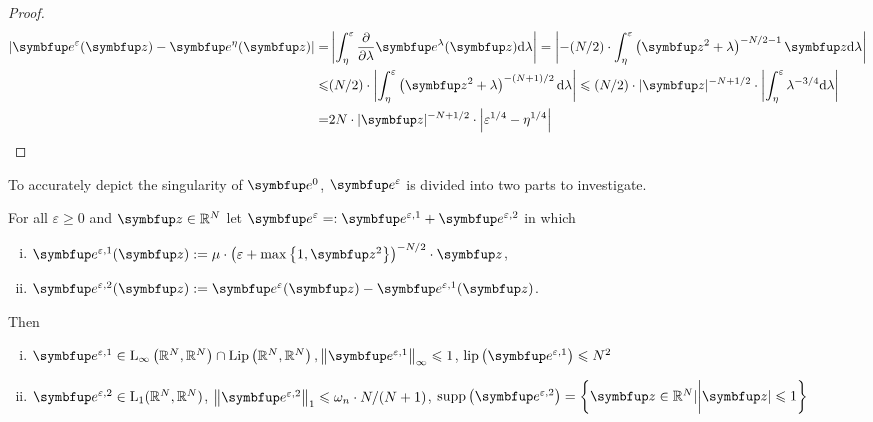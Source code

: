 \begin{lemma}
\begin{proof}
    \begin{equation}
        \begin{aligned}
            \left|\vect{e}^{\varepsilon}(\vect{z})-\vect{e}^{\eta}(\vect{z})\right|=&\left|\int_{\eta}^{\varepsilon} \frac{\partial}{\partial \lambda} \vect{e}^{\lambda}(\vect{z}) \mathrm{d} \lambda\right|=\left|-(N / 2) \cdot \int_{\eta}^{\varepsilon}\left(\vect{z}^{2}+\lambda\right)^{-N / 2-1} \vect{z} \mathrm{d} \lambda\right|\\
            \leqslant &(N / 2) \cdot\left|\int_{\eta}^{\varepsilon}\left(\vect{z}^{2}+\lambda\right)^{-(N+1) / 2} \mathrm{d} \lambda\right| \leqslant(N / 2) \cdot|\vect{z}|^{-N+1 / 2} \cdot\left|\int_{\eta}^{\varepsilon} \lambda^{-3 / 4} \mathrm{d} \lambda\right|\\
            = & 2N \cdot|\vect{z}|^{-N+1 / 2} \cdot\left|\varepsilon^{1 / 4}-\eta^{1 / 4}\right|
        \end{aligned}
    \end{equation}
\end{proof}

To accurately depict the singularity of $ \vect{e}^{0}$, $\vect{e}^{\varepsilon}$ is divided into two parts to investigate.
\begin{definition}
    For all $\varepsilon \geqslant 0$ and $\vect{z} \in \bbR^{N}$ let $\vect{e}^{\varepsilon}=:\vect{e}^{\varepsilon, 1}+\vect{e}^{\varepsilon, 2}$ in which 
    \begin{enumerate}[(i)]
        \item $\vect{e}^{\varepsilon, 1}(\vect{z}):=\mu \cdot\left(\varepsilon+\max \left\{1, \vect{z}^{2}\right\}\right)^{-N / 2} \cdot \vect{z}$,
        \item $\vect{e}^{\varepsilon, 2}(\vect{z}):=\vect{e}^{\varepsilon}(\vect{z})-\vect{e}^{\varepsilon, 1}(\vect{z})$. 
    \end{enumerate}
\end{definition}

\begin{lemma}
      Then
     \begin{enumerate}[(i)]
         \item $\vect{e}^{\varepsilon, 1} \in \mathrm{L}_{\infty}\left(\bbR^{N}, \bbR^{N}\right) \cap \operatorname{Lip}\left(\bbR^{N}, \bbR^{N}\right),\left\|\vect{e}^{\varepsilon, 1}\right\|_{\infty} \leqslant 1$, $\operatorname{lip}\left(\vect{e}^{\varepsilon, 1}\right) \leqslant N^{2}$
         \item $\vect{e}^{\varepsilon, 2} \in \mathrm{L}_{1}(\bbR^{N}, \bbR^{N})$, $\left\|\vect{e}^{\varepsilon, 2}\right\|_{1} \leqslant \omega_{n} \cdot N /(N+1)$, 
         $\operatorname{supp}\left(\vect{e}^{\varepsilon, 2}\right)=\left\{\vect{z} \in \bbR^{N}|\bigg| \vect{z} | \leqslant 1\right\}$
     \end{enumerate}
     

\end{lemma}
\end{lemma}
